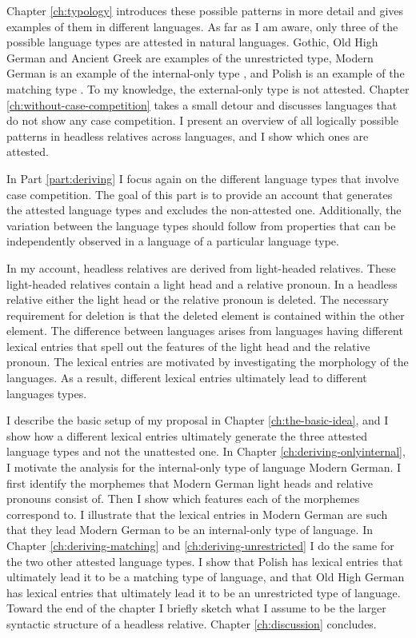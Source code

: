 Chapter \ref{ch:typology} introduces these possible patterns in more detail and gives examples of them in different languages. As far as I am aware, only three of the possible language types are attested in natural languages. Gothic, Old High German and Ancient Greek are examples of the unrestricted type, Modern German is an example of the internal-only type \citep{vogel2001}, and Polish is an example of the matching type \citep{citko2013}. To my knowledge, the external-only type is not attested.
Chapter \ref{ch:without-case-competition} takes a small detour and discusses languages that do not show any case competition. I present an overview of all logically possible patterns in headless relatives across languages, and I show which ones are attested.

In Part \ref{part:deriving} I focus again on the different language types that involve case competition. The goal of this part is to provide an account that generates the attested language types and excludes the non-attested one. Additionally, the variation between the language types should follow from properties that can be independently observed in a language of a particular language type.

In my account, headless relatives are derived from light-headed relatives. These light-headed relatives contain a light head and a relative pronoun. In a headless relative either the light head or the relative pronoun is deleted. The necessary requirement for deletion is that the deleted element is contained within the other element.
The difference between languages arises from languages having different lexical entries that spell out the features of the light head and the relative pronoun.
The lexical entries are motivated by investigating the morphology of the languages. As a result, different lexical entries ultimately lead to different languages types.

I describe the basic setup of my proposal in Chapter \ref{ch:the-basic-idea}, and I show how a different lexical entries ultimately generate the three attested language types and not the unattested one.
In Chapter \ref{ch:deriving-onlyinternal}, I motivate the analysis for the internal-only type of language Modern German. I first identify the morphemes that Modern German light heads and relative pronouns consist of. Then I show which features each of the morphemes correspond to. I illustrate that the lexical entries in Modern German are such that they lead Modern German to be an internal-only type of language.
In Chapter \ref{ch:deriving-matching} and \ref{ch:deriving-unrestricted} I do the same for the two other attested language types. I show that Polish has lexical entries that ultimately lead it to be a matching type of language, and that Old High German has lexical entries that ultimately lead it to be an unrestricted type of language.
Toward the end of the chapter I briefly sketch what I assume to be the larger syntactic structure of a headless relative.
Chapter \ref{ch:discussion} concludes.

